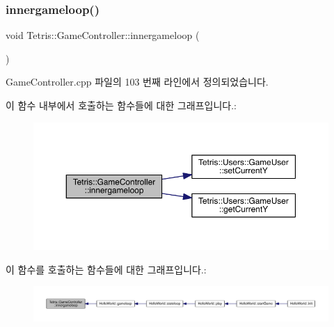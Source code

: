 \subsubsection{\texorpdfstring{innergameloop()}{innergameloop()}\hspace{0.1cm}{\footnotesize\ttfamily [1/2]}}
{\footnotesize\ttfamily void Tetris\+::\+Game\+Controller\+::innergameloop (\begin{DoxyParamCaption}{ }\end{DoxyParamCaption})}



Game\+Controller.\+cpp 파일의 103 번째 라인에서 정의되었습니다.

이 함수 내부에서 호출하는 함수들에 대한 그래프입니다.\+:
\nopagebreak
\begin{figure}[H]
\begin{center}
\leavevmode
\includegraphics[width=350pt]{class_tetris_1_1_game_controller_a9dd5159934835ef54cb3c0b24cbc1fd6_cgraph}
\end{center}
\end{figure}
이 함수를 호출하는 함수들에 대한 그래프입니다.\+:
\nopagebreak
\begin{figure}[H]
\begin{center}
\leavevmode
\includegraphics[width=350pt]{class_tetris_1_1_game_controller_a9dd5159934835ef54cb3c0b24cbc1fd6_icgraph}
\end{center}
\end{figure}
\mbox{\label{class_tetris_1_1_game_controller_a028a1a0270750bcae1e2e2cbbbe7609a}} 
